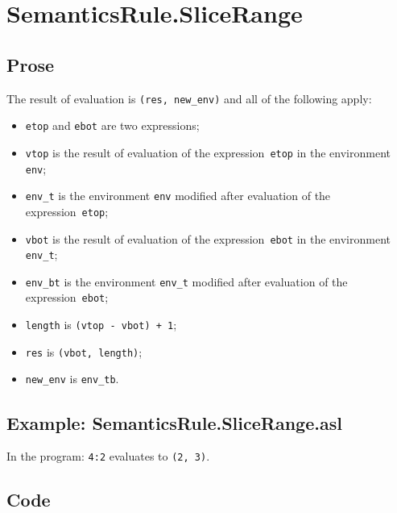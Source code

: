 \documentclass{book}
\begin{document}

\section{SemanticsRule.SliceRange \label{sec:SemanticsRule.SliceRange}}

  \subsection{Prose}
  The result of evaluation is \texttt{(res, new\_env)} and all of the following apply:
  \begin{itemize}
  \item \texttt{etop} and \texttt{ebot} are two expressions;
  \item \texttt{vtop} is the result of evaluation of the expression~\texttt{etop} in the environment \texttt{env}; 
  \item \texttt{env\_t} is the environment \texttt{env} modified after evaluation of the expression~\texttt{etop}; 
  \item \texttt{vbot} is the result of evaluation of the expression~\texttt{ebot} in the environment \texttt{env\_t}; 
  \item \texttt{env\_bt} is the environment \texttt{env\_t} modified after evaluation of the expression~\texttt{ebot}; 
  \item \texttt{length} is \texttt{(vtop - vbot) + 1};
  \item \texttt{res} is \texttt{(vbot, length)};
  \item \texttt{new\_env} is \texttt{env\_tb}.
  \end{itemize}

  \subsection{Example: SemanticsRule.SliceRange.asl}
  In the program:
  \texttt{4:2} evaluates to \texttt{(2, 3)}.

  \subsection{Code}
\end{document}

